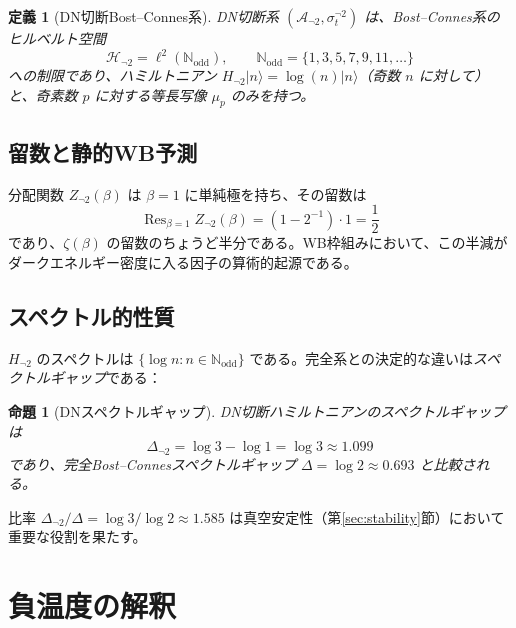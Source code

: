 \documentclass[12pt,a4paper]{article}
\newtheorem{proposition}[theorem]{命題}
\newtheorem{definition}[theorem]{定義}
\newcommand{\Res}{\operatorname{Res}}
\begin{document}
\begin{definition}[DN切断Bost--Connes系]
DN切断系 $(\mathcal{A}_{\neg 2}, \sigma_t^{\neg 2})$ は、Bost--Connes系のヒルベルト空間
\begin{equation}
  \mathcal{H}_{\neg 2} = \ell^2(\mathbb{N}_{\mathrm{odd}}), \qquad \mathbb{N}_{\mathrm{odd}} = \{1, 3, 5, 7, 9, 11, \ldots\}
\end{equation}
への制限であり、ハミルトニアン $H_{\neg 2}|n\rangle = \log(n)|n\rangle$（奇数 $n$ に対して）と、奇素数 $p$ に対する等長写像 $\mu_p$ のみを持つ。
\end{definition}

\subsection{留数と静的WB予測}

分配関数 $Z_{\neg 2}(\beta)$ は $\beta = 1$ に単純極を持ち、その留数は
\begin{equation}\label{eq:DN-residue}
  \Res_{\beta=1} Z_{\neg 2}(\beta) = (1-2^{-1}) \cdot 1 = \frac{1}{2}
\end{equation}
であり、$\zeta(\beta)$ の留数のちょうど半分である。WB枠組みにおいて、この半減がダークエネルギー密度に入る因子の算術的起源である。

\subsection{スペクトル的性質}

$H_{\neg 2}$ のスペクトルは $\{\log n : n \in \mathbb{N}_{\mathrm{odd}}\}$ である。完全系との決定的な違いは\emph{スペクトルギャップ}である：

\begin{proposition}[DNスペクトルギャップ]\label{prop:gap}
DN切断ハミルトニアンのスペクトルギャップは
\begin{equation}
  \Delta_{\neg 2} = \log 3 - \log 1 = \log 3 \approx 1.099
\end{equation}
であり、完全Bost--Connesスペクトルギャップ $\Delta = \log 2 \approx 0.693$ と比較される。
\end{proposition}

比率 $\Delta_{\neg 2}/\Delta = \log 3/\log 2 \approx 1.585$ は真空安定性（第\ref{sec:stability}節）において重要な役割を果たす。

\section{負温度の解釈}
\label{sec:neg-temp}
\end{document}

